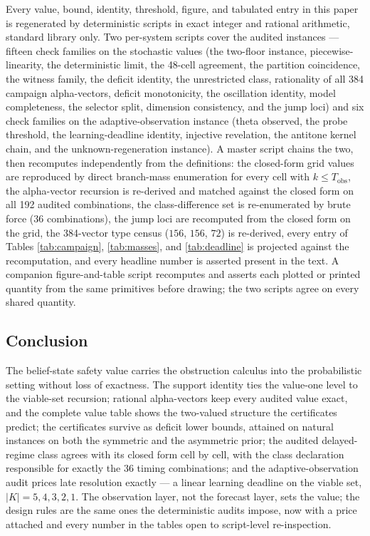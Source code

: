 \documentclass[10pt,twocolumn]{article}
\theoremstyle{plain}
\theoremstyle{definition}
\theoremstyle{remark}
\begin{document}
Every value, bound, identity, threshold, figure, and tabulated entry in
this paper is regenerated by deterministic scripts in exact integer and
rational arithmetic, standard library only. Two per-system scripts cover
the audited instances --- fifteen check families on the stochastic values
(the two-floor instance, piecewise-linearity, the deterministic limit,
the 48-cell agreement, the partition coincidence, the witness family,
the deficit identity, the unrestricted class, rationality of all 384
campaign alpha-vectors, deficit monotonicity, the oscillation identity,
model completeness, the selector split, dimension consistency, and the
jump loci) and six check families on the adaptive-observation instance
(theta observed, the probe threshold, the learning-deadline identity,
injective revelation, the antitone kernel chain, and the
unknown-regeneration instance). A master script chains the two, then
recomputes independently from the definitions: the closed-form grid
values are reproduced by direct branch-mass enumeration for every cell
with \(k \le T_{\mathrm{obs}}\), the alpha-vector recursion is
re-derived and matched against the closed form on all 192 audited
combinations, the class-difference set is re-enumerated by brute force
(36 combinations), the jump loci are recomputed from the closed form on
the grid, the 384-vector type census (\(156\), \(156\), \(72\)) is
re-derived, every entry of Tables \ref{tab:campaign}, \ref{tab:masses},
and \ref{tab:deadline} is projected against the recomputation, and every
headline number is asserted present in the text. A companion
figure-and-table script recomputes and asserts each plotted or printed
quantity from the same primitives before drawing; the two scripts agree
on every shared quantity.

\subsection{Conclusion}\label{conclusion}

The belief-state safety value carries the obstruction calculus into the
probabilistic setting without loss of exactness. The support identity
ties the value-one level to the viable-set recursion; rational
alpha-vectors keep every audited value exact, and the complete value
table shows the two-valued structure the certificates predict; the
certificates survive as deficit lower bounds, attained on natural
instances on both the symmetric and the asymmetric prior; the audited
delayed-regime class agrees with its closed form cell by cell, with the
class declaration responsible for exactly the 36 timing combinations;
and the adaptive-observation audit prices late resolution exactly --- a
linear learning deadline on the viable set, \(|K| = 5, 4, 3, 2, 1\). The
observation layer, not the forecast layer, sets the value; the design
rules are the same ones the deterministic audits impose, now with a
price attached and every number in the tables open to script-level
re-inspection.
\end{document}
